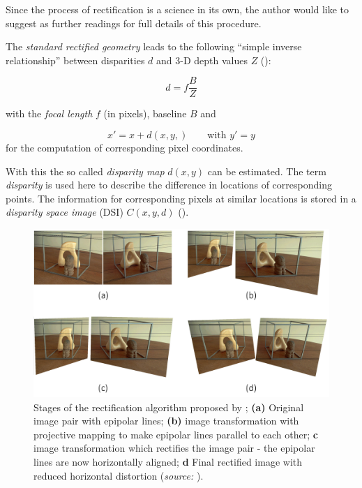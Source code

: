 Since the process of rectification is a science in its own, the author would like to suggest \cite{Loop.2001} as further readings for full details of this procedure.

The \textit{standard rectified geometry} leads to the following \enquote{simple inverse relationship} between disparities $d$ and 3-D depth values $Z$ (\cite[p.473]{Szeliski.2011}):

\begin{equation}
 d = f \frac{B}{Z} \label{eq:disparity}
\end{equation}

with the \textit{focal length} $f$ (in pixels), baseline $B$ and 

\begin{equation}
 x'=x+d(x,y,) 
 \qquad
 \text{with }
 y'=y
\end{equation}
for the computation of corresponding pixel coordinates.

With this the so called \textit{disparity map} $d(x,y)$ can be estimated. The term \textit{disparity} is used here to describe the difference in locations of corresponding points. The information for corresponding pixels at similar locations is stored in a \textit{disparity space image} (DSI) $C(x,y,d)$ (\cite[p.473]{Szeliski.2011}).

\begin{figure}[htbp]
		\centering
		\includegraphics[width=1.0\textwidth]{figures/Rectify}
		\caption[Stages of the rectification algorithm]{Stages of the rectification algorithm proposed by \cite{Loop.2001}; \textbf{(a)} Original image pair with epipolar lines; \textbf{(b)} image transformation with projective mapping to make epipolar lines parallel to each other; \textbf{c} image transformation which rectifies the image pair - the epipolar lines are now horizontally aligned; \textbf{d} Final rectified image with reduced horizontal distortion    (\textit{source:} \cite[p.12]{Loop.2001}).}
		\label{fig:Rectify}
\end{figure} 